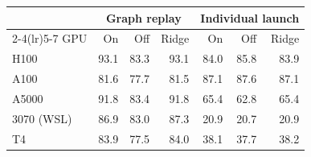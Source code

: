 \begin{tabular}{lrrrrrr}
\toprule
 & \multicolumn{3}{c}{Graph replay} & \multicolumn{3}{c}{Individual launch} \\
\cmidrule(lr){2-4}\cmidrule(lr){5-7}
GPU & On & Off & Ridge & On & Off & Ridge \\
\midrule
H100 & 93.1 & 83.3 & 93.1 & 84.0 & 85.8 & 83.9 \\
A100 & 81.6 & 77.7 & 81.5 & 87.1 & 87.6 & 87.1 \\
A5000 & 91.8 & 83.4 & 91.8 & 65.4 & 62.8 & 65.4 \\
3070 (WSL) & 86.9 & 83.0 & 87.3 & 20.9 & 20.7 & 20.9 \\
T4 & 83.9 & 77.5 & 84.0 & 38.1 & 37.7 & 38.2 \\
\bottomrule
\end{tabular}
